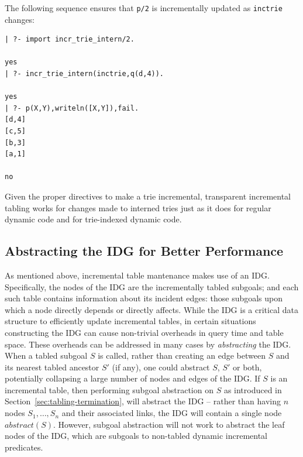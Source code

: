 %
The following sequence ensures that {\tt p/2} is incrementally updated
as {\tt inctrie} changes:
%
\begin{verbatim}
| ?- import incr_trie_intern/2.

yes
| ?- incr_trie_intern(inctrie,q(d,4)).

yes
| ?- p(X,Y),writeln([X,Y]),fail.
[d,4]
[c,5]
[b,3]
[a,1]

no
\end{verbatim}
%
Given the proper directives to make a trie incremental, transparent
incremental tabling works for changes made to interned tries just as
it does for regular dynamic code and for trie-indexed dynamic code.

\subsection{Abstracting the IDG for Better Performance} \label{sec:IDG-abs}
As mentioned above, incremental table mantenance makes use of an IDG.
Specifically, the nodes of the IDG are the incrementally tabled
subgoals; and each such table contains information about its incident
edges: those subgoals upon which a node directly depends or directly
affects.  While the IDG is a critical data structure to efficiently
update incremental tables, in certain situations constructing the IDG
can cause non-trivial overheads in query time and table space.  These
overheads can be addressed in many cases by {\em abstracting} the IDG.
When a tabled subgoal $S$ is called, rather than creating an edge
between $S$ and its nearest tabled ancestor $S'$ (if any), one could
abstract $S$, $S'$ or both, potentially collapsing a large number of
nodes and edges of the IDG.  If $S$ is an incremental table, then
performing subgoal abstraction on $S$ as introduced in
Section~\ref{sec:tabling-termination}, will abstract the IDG -- rather
than having $n$ nodes $S_1,\ldots,S_n$ and their associated links, the
IDG will contain a single node $abstract(S)$.  However, subgoal
abstraction will not work to abstract the leaf nodes of the IDG, which
are subgoals to non-tabled dynamic incremental predicates.

